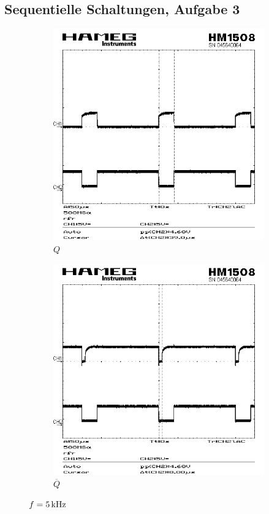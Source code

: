 \documentclass[numbers=noenddot,12pt,a4paper]{scrartcl}
\newcommand{\nicht}[1]{\overline{#1}}
\begin{document}
\subsection{Sequentielle Schaltungen, Aufgabe 3}
\begin{figure}[H]
\centering
\begin{subfigure}[b]{0.48\textwidth}
\includegraphics[width=\textwidth]{seq15khzq.png}
\caption{$Q$}
\end{subfigure}
\begin{subfigure}[b]{0.48\textwidth}
\includegraphics[width=\textwidth]{seq15khzqquer.png}
\caption{$\nicht{Q}$}
\end{subfigure}
\caption{$f=\unit[5]{kHz}$}
\end{figure}
\end{document}
